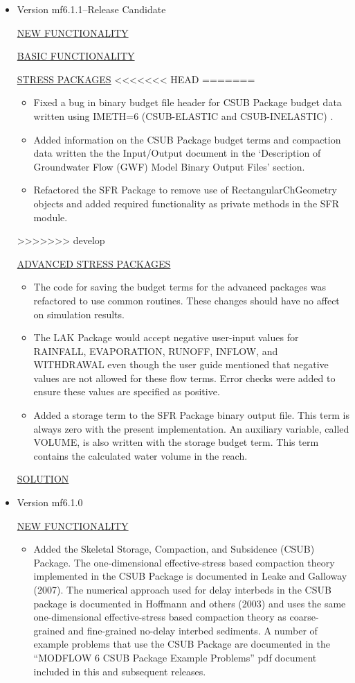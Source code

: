 \documentclass[11pt,twoside,twocolumn]{usgsreport}
\begin{document}
\begin{itemize}
\item Version mf6.1.1--Release Candidate

\underline{NEW FUNCTIONALITY}

\underline{BASIC FUNCTIONALITY}

\underline{STRESS PACKAGES}
<<<<<<< HEAD
=======
\begin{itemize}
	\item Fixed a bug in binary budget file header for CSUB Package budget data written using IMETH=6 (CSUB-ELASTIC and CSUB-INELASTIC) .
	\item Added information on the CSUB Package budget terms and compaction data written the the Input/Output document in the `Description of Groundwater Flow (GWF) Model Binary Output Files' section.
	\item Refactored the SFR Package to remove use of RectangularChGeometry objects and added required functionality as private methods in the SFR module.
\end{itemize}
>>>>>>> develop

\underline{ADVANCED STRESS PACKAGES}
\begin{itemize}
\item The code for saving the budget terms for the advanced packages was refactored to use common routines.  These changes should have no affect on simulation results.
\item The LAK Package would accept negative user-input values for  RAINFALL, EVAPORATION, RUNOFF, INFLOW, and WITHDRAWAL even though the user guide mentioned that negative values are not allowed for these flow terms.  Error checks were added to ensure these values are specified as positive.
\item Added a storage term to the SFR Package binary output file.  This term is always zero with the present implementation.  An auxiliary variable, called VOLUME, is also written with the storage budget term.  This term contains the calculated water volume in the reach.
\end{itemize}

\underline{SOLUTION}

\item Version mf6.1.0

\underline{NEW FUNCTIONALITY}
\begin{itemize}
	\item Added the Skeletal Storage, Compaction, and Subsidence (CSUB) Package. The one-dimensional effective-stress based compaction theory implemented in the CSUB Package is documented in Leake and Galloway (2007). The numerical approach used for delay interbeds in the CSUB package is documented in Hoffmann and others (2003) and uses the same one-dimensional effective-stress based compaction theory as coarse-grained and fine-grained no-delay interbed sediments. A number of example problems that use the CSUB Package are documented in the ``MODFLOW 6 CSUB Package Example Problems'' pdf document included in this and subsequent releases.
\end{itemize}


\end{itemize}
\end{document}
